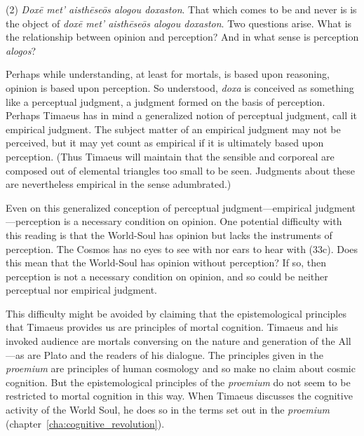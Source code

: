 (2) \emph{Doxē met' aisthēseōs alogou doxaston}. That which comes to be and never is is the object of \emph{doxē met' aisthēseōs alogou doxaston}. Two questions arise. What is the relationship between opinion and perception? And in what sense is perception \emph{alogos}? 

Perhaps while understanding, at least for mortals, is based upon reasoning, opinion is based upon perception. So understood, \emph{doxa} is conceived as something like a perceptual judgment, a judgment formed on the basis of perception. Perhaps Timaeus has in mind a generalized notion of perceptual judgment, call it empirical judgment. The subject matter of an empirical judgment may not be perceived, but it may yet count as empirical if it is ultimately based upon perception. (Thus Timaeus will maintain that the sensible and corporeal are composed out of elemental triangles too small to be seen. Judgments about these are nevertheless empirical in the sense adumbrated.)

Even on this generalized conception of perceptual judgment---empirical judgment---perception is a necessary condition on opinion. One potential difficulty with this reading is that the World-Soul has opinion but lacks the instruments of perception. The Cosmos has no eyes to see with nor ears to hear with (33c). Does this mean that the World-Soul has opinion without perception? If so, then perception is not a necessary condition on opinion, and so could be neither perceptual nor empirical judgment. 

This difficulty might be avoided by claiming that the epistemological principles that Timaeus provides us are principles of mortal cognition. Timaeus and his invoked audience are mortals conversing on the nature and generation of the All---as are Plato and the readers of his dialogue. The principles given in the \emph{proemium} are principles of human cosmology and so make no claim about cosmic cognition. But the epistemological principles of the \emph{proemium} do not seem to be restricted to mortal cognition in this way. When Timaeus discusses the cognitive activity of the World Soul, he does so in the terms set out in the \emph{proemium} (chapter~\ref{cha:cognitive_revolution}).

